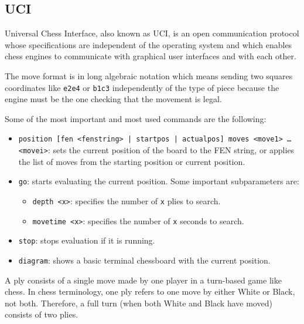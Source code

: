 \subsection{UCI}

Universal Chess Interface, also known as UCI, is an open communication protocol whose specifications are independent of the operating system and which enables chess engines to communicate with graphical user interfaces and with each other.

\vspace{1em}

\noindent The move format is in long algebraic notation which means sending two squares coordinates like \texttt{e2e4} or \texttt{b1c3} independently of the type of piece because the engine must be the one checking that the movement is legal.

\vspace{1em}

\noindent Some of the most important and most used commands are the following:

\begin{itemize}
    \item \texttt{position [fen <fenstring> | startpos | actualpos] moves <move1> \ldots \\<movei>}: sets the current position of the board to the FEN string, or applies the list of moves from the starting position or current position.

    \item \texttt{go}: starts evaluating the current position. Some important subparameters are:
    \begin{itemize}
        \item \texttt{depth <x>}: specifies the number of \texttt{x} plies to search.
        \item \texttt{movetime <x>}: specifies the number of \texttt{x} seconds to search. 
    \end{itemize}

    \item \texttt{stop}: stops evaluation if it is running.
    \item \texttt{diagram}: shows a basic terminal chessboard with the current position.
\end{itemize}

\noindent A ply consists of a single move made by one player in a turn-based game like chess. In chess terminology, one ply refers to one move by either White or Black, not both. Therefore, a full turn (when both White and Black have moved) consists of two plies.

